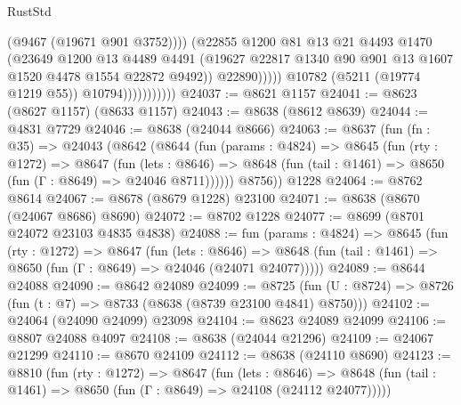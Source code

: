 \begin{lexlean}{RustStd}
\begin{coremodule}
                                      (@9467 (@19671 @901 @3752))))
                                  (@22855
                                    @1200
                                    @81
                                    @13
                                    @21
                                    @4493
                                    @1470
                                    (@23649
                                      @1200
                                      @13
                                      @4489
                                      @4491
                                      (@19627
                                        @22817
                                        @1340
                                        @90
                                        @901
                                        @13
                                        @1607
                                        @1520
                                        @4478
                                        @1554
                                        @22872
                                        @9492))
                                    @22890)))))
                          @10782
                          (@5211 (@19774 @1219 @55))
                          @10794)))))))))))
@24037 := @8621 @1157
@24041 := @8623 (@8627 @1157) (@8633 @1157)
@24043 := @8638 (@8612 @8639)
@24044 := @4831 @7729
@24046 := @8638 (@24044 @8666)
@24063 := @8637
    (fun (fn : @35) =>
    @24043
      (@8642
        (@8644
          (fun (params : @4824) =>
          @8645
            (fun (rty : @1272) =>
            @8647
              (fun (lets : @8646) =>
              @8648 (fun (tail : @1461) => @8650 (fun (Γ : @8649) => @24046 @8711))))))
        @8756))
    @1228
@24064 := @8762 @8614
@24067 := @8678 (@8679 @1228) @23100
@24071 := @8638 (@8670 (@24067 @8686) @8690)
@24072 := @8702 @1228
@24077 := @8699 (@8701 @24072 @23103 @4835 @4838)
@24088 := fun (params : @4824) =>
  @8645
    (fun (rty : @1272) =>
    @8647
      (fun (lets : @8646) =>
      @8648 (fun (tail : @1461) => @8650 (fun (Γ : @8649) => @24046 (@24071 @24077)))))
@24089 := @8644 @24088
@24090 := @8642 @24089
@24099 := @8725
    (fun (U : @8724) => @8726 (fun (t : @7) => @8733 (@8638 (@8739 @23100 @4841) @8750)))
@24102 := @24064 (@24090 @24099) @23098
@24104 := @8623 @24089 @24099
@24106 := @8807 @24088 @4097
@24108 := @8638 (@24044 @21296)
@24109 := @24067 @21299
@24110 := @8670 @24109
@24112 := @8638 (@24110 @8690)
@24123 := @8810
    (fun (rty : @1272) =>
    @8647
      (fun (lets : @8646) =>
      @8648 (fun (tail : @1461) => @8650 (fun (Γ : @8649) => @24108 (@24112 @24077)))))

\end{coremodule}
\end{lexlean}
